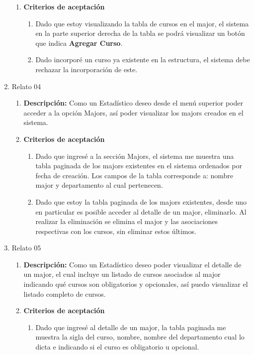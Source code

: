 \begin{enumerate}
\begin{enumerate}
			\item \textbf{Criterios de aceptación}
				\begin{enumerate}
					\item Dado que estoy visualizando la tabla de cursos en el major, el sistema en la parte superior derecha de la tabla se podrá visualizar un botón que indica \textbf{Agregar Curso}.
					\item Dado incorporé un curso ya existente en la estructura, el sistema debe rechazar la incorporación de este.
				\end{enumerate}
		\end{enumerate}
	\item Relato 04
		\begin{enumerate}
			\item \textbf{Descripción:} Como un Estadístico deseo desde el menú superior poder acceder a la opción Majors, así poder visualizar los majors creados en el sistema.
			\item \textbf{Criterios de aceptación}
				\begin{enumerate}
					\item Dado que ingresé a la sección Majors, el sistema me muestra una tabla paginada de los majors existentes en el sistema ordenados por fecha de creación. Los campos de la tabla corresponde a: nombre major y departamento al cual pertenecen.
					\item Dado que estoy la tabla paginada de los majors existentes, desde uno en particular es posible acceder al detalle de un major, eliminarlo. Al realizar la eliminación se elimina el major y las asociaciones respectivas con los cursos, sin eliminar estos últimos.
				\end{enumerate}
		\end{enumerate}
	\item Relato 05
		\begin{enumerate}
			\item \textbf{Descripción:} Como un Estadístico deseo poder visualizar el detalle de un major, el cual incluye un listado de cursos asociados al major indicando qué cursos son obligatorios y opcionales, así puedo visualizar el listado completo de cursos.
			\item \textbf{Criterios de aceptación}
				\begin{enumerate}
					\item Dado que ingresé al detalle de un major, la tabla paginada me muestra la sigla del curso, nombre, nombre del departamento cual lo dicta e indicando si el curso es obligatorio u opcional.

\end{enumerate}
\end{enumerate}
\end{enumerate}
